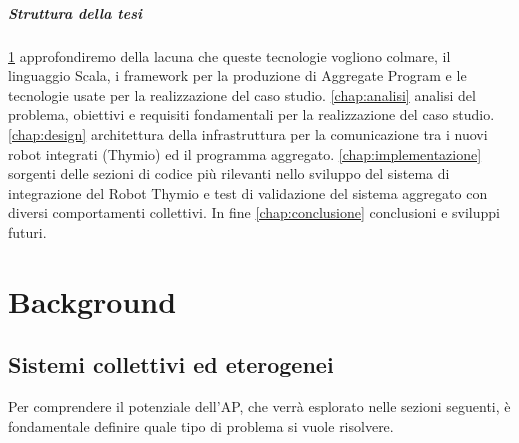 \documentclass[12pt,a4paper,openright,twoside]{book}
\begin{document}

\paragraph{Struttura della tesi} \cref{chap:background} approfondiremo della lacuna che queste tecnologie vogliono colmare, il linguaggio Scala, i framework per la produzione di Aggregate Program e le tecnologie usate per la realizzazione del caso studio. \cref{chap:analisi} analisi del problema, obiettivi e requisiti fondamentali per la realizzazione del caso studio. \cref{chap:design} architettura della infrastruttura per la comunicazione tra i nuovi robot integrati (Thymio) ed il programma aggregato. \cref{chap:implementazione} sorgenti delle sezioni di codice più rilevanti nello sviluppo del sistema di integrazione del Robot Thymio e test di validazione del sistema aggregato con diversi comportamenti collettivi. In fine \cref{chap:conclusione} conclusioni e sviluppi futuri.

\chapter{Background}
\label{chap:background}



\section{Sistemi collettivi ed eterogenei} 

Per comprendere il potenziale dell'\ac{AP}, che verrà esplorato nelle sezioni seguenti, è fondamentale definire quale tipo di problema si vuole risolvere. 
\end{document}
